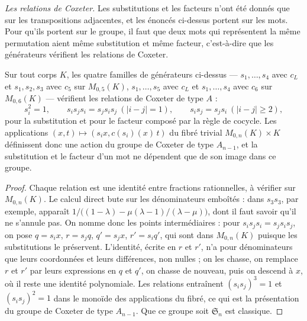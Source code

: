 \noindent\emph{Les relations de Coxeter.} Les substitutions et les facteurs n'ont été donnés que sur les transpositions adjacentes, et les énoncés ci-dessus portent sur les mots. Pour qu'ils portent sur le groupe, il faut que deux mots qui représentent la même permutation aient même substitution et même facteur, c'est-à-dire que les générateurs vérifient les relations de Coxeter.

\begin{encadre}
\begin{enonce}
Sur tout corps $K$, les quatre familles de générateurs ci-dessus --- $s_1, \ldots, s_4$ avec $c_L$ et $s_1, s_2, s_3$ avec $c_5$ sur $M_{0,5}(K)$, $s_1, \ldots, s_5$ avec $c_L$ et $s_1, \ldots, s_4$ avec $c_6$ sur $M_{0,6}(K)$ --- vérifient les relations de Coxeter de type $A$ :
\[
s_i^2 = 1, \qquad s_i s_j s_i = s_j s_i s_j \ (|i - j| = 1), \qquad s_i s_j = s_j s_i \ (|i - j| \geq 2),
\]
pour la substitution et pour le facteur composé par la règle de cocycle. Les applications $(x, t) \mapsto (s_i x, c(s_i)(x)\, t)$ du fibré trivial $M_{0,n}(K) \times K$ définissent donc une action du groupe de Coxeter de type $A_{n-1}$, et la substitution et le facteur d'un mot ne dépendent que de son image dans ce groupe.
\end{enonce}
\end{encadre}

\begin{proof}
Chaque relation est une identité entre fractions rationnelles, à vérifier sur $M_{0,n}(K)$. Le calcul direct bute sur les dénominateurs emboîtés : dans $s_3 s_3$, par exemple, apparaît $1/\bigl((1 - \lambda) - \mu(\lambda - 1)/(\lambda - \mu)\bigr)$, dont il faut savoir qu'il ne s'annule pas. On nomme donc les points intermédiaires : pour $s_i s_j s_i = s_j s_i s_j$, on pose $q = s_i x$, $r = s_j q$, $q' = s_j x$, $r' = s_i q'$, qui sont dans $M_{0,n}(K)$ puisque les substitutions le préservent. L'identité, écrite en $r$ et $r'$, n'a pour dénominateurs que leurs coordonnées et leurs différences, non nulles ; on les chasse, on remplace $r$ et $r'$ par leurs expressions en $q$ et $q'$, on chasse de nouveau, puis on descend à $x$, où il reste une identité polynomiale. Les relations entraînent $(s_i s_j)^3 = 1$ et $(s_i s_j)^2 = 1$ dans le monoïde des applications du fibré, ce qui est la présentation du groupe de Coxeter de type $A_{n-1}$. Que ce groupe soit $\mathfrak S_n$ est classique.
\end{proof}

